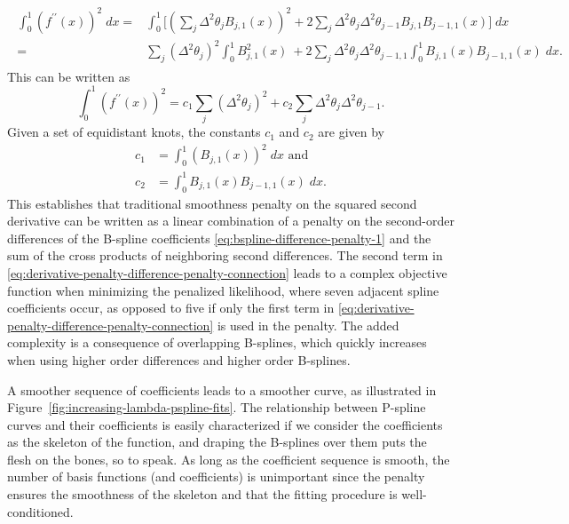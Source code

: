 \begin{align}
\begin{split}
\int_0^1 \left( f^{\prime \prime}\left(x\right)\right)^2\;dx  = {} &  \int_0^1 \bigg[ \left( \sum\limits_{j} \Delta^2 \theta_j  B_{j,1}\left(x\right) \right)^2  + 2 \sum_{j}\Delta^2 \theta_j\Delta^2 \theta_{j-1}B_{j,1}B_{j-1,1}\left(x\right) \bigg]\;dx\\ 
= {} & \sum \limits_{j}  \left( \Delta^2\theta_j \right)^2 \int_0^1 B_{j,1}^2\left(x\right)\ + 2 \sum\limits_{j} \Delta^2 \theta_j\Delta^2 \theta_{j-1,1} \int_0^1 B_{j,1}\left(x\right)B_{j-1,1}\left(x\right)\;dx. 
\end{split}
\end{align}
\noindent
This can be written as
\begin{equation} \label{eq:derivative-penalty-difference-penalty-connection}
\int_0^1 \left( f^{\prime \prime}\left(x\right)\right)^2  = c_1 \sum\limits_{j} \left( \Delta^2 \theta_j\right)^2 + c_2 \sum\limits_{j} \Delta^2 \theta_j\Delta^2 \theta_{j-1}.
\end{equation}
\noindent
Given a set of equidistant knots, the constants $c_1$ and $c_2$ are given by
\begin{equation}
\begin{split}
c_1 & =   \int_0^1 \left(B_{j,1}\left(x\right)\right)^2\;dx \mbox{ and}\\
c_2 & = \int_0^1 B_{j,1}\left(x\right)B_{j-1,1}\left(x\right) \;dx.
\end{split}
\end{equation}
This establishes that traditional smoothness penalty on the squared second derivative can be written as a linear combination of a penalty on the second-order differences of the B-spline coefficients \eqref{eq:bspline-difference-penalty-1} and the sum of the cross products of neighboring second differences. The second term in \eqref{eq:derivative-penalty-difference-penalty-connection} leads to a complex objective function when minimizing the penalized likelihood, where seven adjacent spline coefficients occur, as opposed to five if only the first term in \eqref{eq:derivative-penalty-difference-penalty-connection} is used in the penalty. The added complexity is a consequence of overlapping B-splines, which quickly increases when using higher order differences and higher order B-splines. 

\bigskip

A smoother sequence of coefficients leads to a smoother curve, as illustrated in Figure~\ref{fig:increasing-lambda-pspline-fits}.  The relationship between P-spline curves and their coefficients is easily characterized if we consider the coefficients as the skeleton of the function, and draping the B-splines over them puts the flesh on the bones, so to speak. As long as the coefficient sequence is smooth, the number of basis functions (and coefficients) is unimportant since the penalty ensures the smoothness of the skeleton and that the fitting procedure is well-conditioned.  

